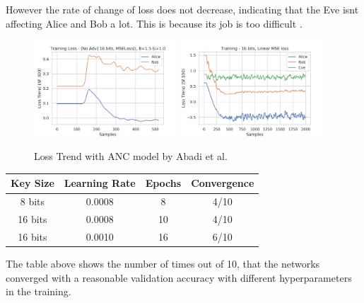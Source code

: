 \documentclass[a4paper]{article}
\begin{document}
  However the rate of change of loss does not decrease, indicating that the Eve isnt affecting 
  Alice and Bob a lot. This is because its job is too difficult \cite{perfanc}.

  \begin{figure}[H]
    \centering
    \includegraphics[width=0.48\textwidth]{../../models/cryptonet/graphs/loss_1E64x256v17.png}
    \includegraphics[width=0.48\textwidth]{../../models/anc/graphs/loss_1E2000v6.png}
    \caption{Loss Trend with ANC model by Abadi et al.}
    \label{fig:res_anc}
  \end{figure}

  \begin{center}
    \begin{tabular}{ c c c c }
      \hline
      \textbf{Key Size} & \textbf{Learning Rate} & \textbf{Epochs} & \textbf{Convergence} \\ \hline
      8 bits            & 0.0008                 & 8               & 4/10                 \\
      16 bits           & 0.0008                 & 10              & 4/10                 \\
      16 bits           & 0.0010                 & 16              & 6/10                 \\
      \hline
    \end{tabular}
  \end{center}
    
  The table above shows the number of times out of 10, that the networks converged with a 
  reasonable validation accuracy with different hyperparameters in the training.\\
\end{document}
